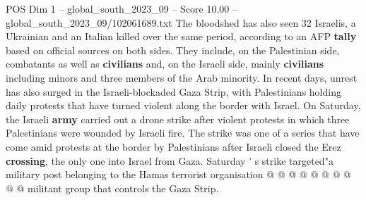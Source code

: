 \begin{textsample}{POS Dim 1 – global\_south\_2023\_09 – Score 10.00 – global\_south\_2023\_09/102061689.txt}
The bloodshed has also seen 32 Israelis, a Ukrainian and an Italian killed over the same period, according to an AFP \textbf{tally} based on official sources on both sides.
They include, on the Palestinian side, combatants as well as \textbf{civilians} and, on the Israeli side, mainly \textbf{civilians} including minors and three members of the Arab minority.
In recent days, unrest has also surged in the Israeli-blockaded Gaza Strip, with Palestinians holding daily protests that have turned violent along the border with Israel.
On Saturday, the Israeli \textbf{army} carried out a drone strike after violent protests in which three Palestinians were wounded by Israeli fire.
The strike was one of a series that have come amid protests at the border by Palestinians after Israeli closed the Erez \textbf{crossing}, the only one into Israel from Gaza.
Saturday ' s strike targeted"a military post belonging to the Hamas terrorist organisation @ @ @ @ @ @ @ @ @ @ militant group that controls the Gaza Strip.

\end{textsample}
